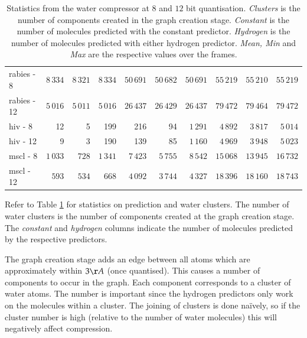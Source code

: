 \documentclass[a4paper]{report}
\begin{document}
\begin{table}
{\begin{tabular}{|l|rrr|rrr|rrr|}
    \hline

    rabies - 8 & $8\,334$ & $8\,321$ & $8\,334$ & $50\,691$ & $50\,682$ &
    $50\,691$ & $55\,219$ & $55\,210$ & $55\,219$ \\

    rabies - 12 & $5\,016$ & $5\,011$ & $5\,016$ & $26\,437$ & $26\,429$ &
    $26\,437$ & $79\,472$ & $79\,464$ & $79\,472$ \\

    \hline

    hiv - 8 & 12 & 5 & 199 & 216 & 94 & $1\,291$ & $4\,892$ & $3\,817$ &
    $5\,014$ \\

    hiv - 12 & 9 & 3 & 190 & 139 & 85 & $1\,160$ & $4\,969$ & $3\,948$ &
    $5\,023$ \\

    \hline

    mscl - 8 & $1\,033$ & $728$ & $1\,341$ & $7\,423$ & $5\,755$ & $8\,542$
    & $15\,068$ & $13\,945$ & $16\,732$ \\

    mscl - 12 & $593$ & $534$ & $668$ & $4\,092$ & $3\,744$ & $4\,327$ &
    $18\,396$ & $18\,160$ & $18\,743$ \\

    \hline

  \end{tabular}
}
\caption{Statistics from the water compressor at $8$ and $12$ bit
  quantisation. \emph{Clusters} is the number of components created in the
  graph creation stage. \emph{Constant} is the number of molecules predicted
  with the constant predictor. \emph{Hydrogen} is the number of molecules
  predicted with either hydrogen predictor. \emph{Mean, Min} and \emph{Max}
  are the respective values over the frames.}
\label{tab:predstats}
\end{table}

Refer to Table \ref{tab:predstats} for statistics on prediction and water
clusters. The number of water clusters is the number of components created at
the graph creation stage. The \emph{constant} and \emph{hydrogen} columns
indicate the number of molecules predicted by the respective predictors.

The graph creation stage adds an edge between all atoms which are
approximately within $3 \AA$ (once quantised). This causes a number of
components to occur in the graph. Each component corresponds to a cluster of
water atoms. The number is important since the hydrogen predictors only work
on the molecules within a cluster. The joining of clusters is done
na\"{i}vely, so if the cluster number is high (relative to the number of water
molecules) this will negatively affect compression.
\end{document}
